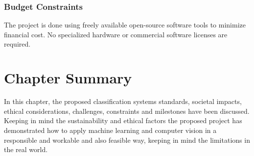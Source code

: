 \subsubsection{Budget Constraints}
The project is done using freely available open-source software tools to minimize financial cost. No specialized hardware or commercial software licenses are required.

\section*{Chapter Summary}

In this chapter, the proposed classification systems standards, societal impacts, ethical considerations, challenges, constraints and milestones have been discussed. Keeping in mind the sustainability and ethical factors the proposed project has demonstrated how to apply machine learning and computer vision in a responsible and workable and also feasible way, keeping in mind the limitations in the real world.